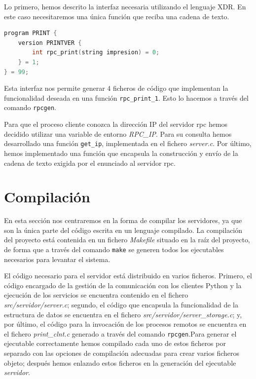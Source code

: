 \documentclass[]{article}
\begin{document}
Lo primero, hemos descrito la interfaz necesaria utilizando el lenguaje XDR. En este caso necesitaremos una única función que reciba una cadena de texto. 

\begin{lstlisting}[language=C, caption=Interfaz XDR]
program PRINT {
    version PRINTVER {
        int rpc_print(string impresion) = 0;
    } = 1;
} = 99;
\end{lstlisting}

Esta interfaz nos permite generar 4 ficheros de código que implementan la funcionalidad deseada en una función \texttt{rpc\_print\_1}. Esto lo hacemos a través del comando \texttt{rpcgen}.

Para que el proceso cliente conozca la dirección IP del servidor rpc hemos decidido utilizar una variable de entorno \textit{RPC\_IP}. Para su consulta hemos desarrollado una función \texttt{get\_ip}, implementada en el fichero \textit{server.c}. Por último, hemos implementado una función que encapsula la construcción y envío de la cadena de texto exigida por el enunciado al servidor rpc. 

\section{Compilación}
\label{sec:compilacion}
En esta sección nos centraremos en la forma de compilar los servidores, ya que son la única parte del código escrita en un lenguaje compilado. La compilación del proyecto está contenida en un fichero \textit{Makefile} situado en la raíz del proyecto, de forma que a través del comando \texttt{make} se generen todos los ejecutables necesarios para levantar el sistema.  

El código necesario para el servidor está distribuido en varios ficheros. Primero, el código encargado de la gestión de la comunicación con los clientes Python y la ejecución de los servicios se encuentra contenido en el fichero \textit{src/servidor/server.c}; segundo, el código que encapsula la funcionalidad de la estructura de datos se encuentra en el fichero \textit{src/servidor/server\_storage.c}; y, por último, el código para la invocación de los procesos remotos se encuentra en el fichero \textit{print\_clnt.c} generado a través del comando \texttt{rpcgen}.Para generar el ejecutable correctamente hemos compilado cada uno de estos ficheros por separado con las opciones de compilación adecuadas para crear varios ficheros objeto; después hemos enlazado estos ficheros en la generación del ejecutable \textit{servidor}.
\end{document}
